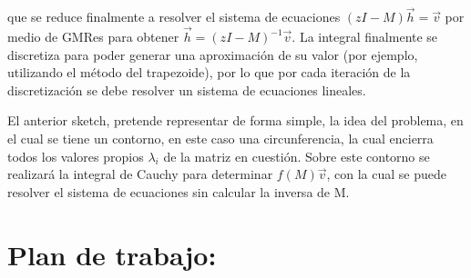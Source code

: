 \documentclass[fleqn]{article}
\begin{document}
que se reduce finalmente a resolver el sistema de ecuaciones $(zI - M)\vec{h} = \vec{v}$ por medio de GMRes para obtener $\vec{h} = (zI - M)^{-1}\vec{v}$. La integral finalmente se discretiza para poder generar una aproximación de su valor (por ejemplo, utilizando el método del trapezoide), por lo que por cada iteración de la discretización se debe resolver un sistema de ecuaciones lineales.


 El anterior sketch, pretende representar de forma simple, la idea del problema, en el cual se tiene un contorno, en este caso una circunferencia, la cual encierra todos los valores propios $\lambda_{i}$ de la matriz en cuestión. Sobre este contorno se realizará la integral de Cauchy para determinar $f(M)\vec{v}$, con la cual se puede resolver el sistema de ecuaciones sin calcular la inversa de M.
 
\section{Plan de trabajo:}
\end{document}
